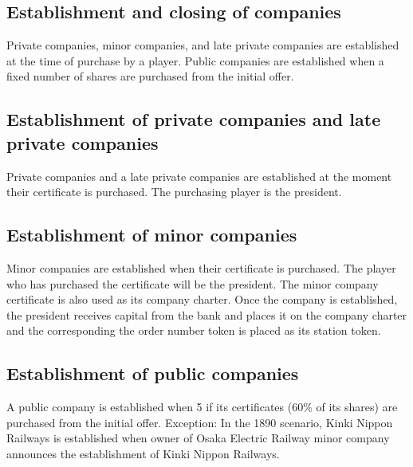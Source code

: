 \documentclass{article}
\begin{document}
\begin{CJK}{UTF8}{min}


\section{Establishment and closing of companies}
Private companies, minor companies, and late private companies are established at
the time of purchase by a player. Public companies are established
when a fixed number of shares are purchased from the initial offer.

\subsection{Establishment of private companies and late private companies}
Private companies and a late private companies are established at the
moment their certificate is purchased. The purchasing player is the
president.

\subsection{Establishment of minor companies}
Minor companies are established when their certificate is
purchased. The player who has purchased the certificate will be the
president. The minor company certificate is also used as its company
charter. Once the company is established, the
president receives capital from the bank and places it on the company
charter and the corresponding the order number token is placed as its
station token.

\subsection{Establishment of public companies}
A public company is established when 5 if its certificates (60\% of
its shares) are purchased from the initial offer. Exception: In the
1890 scenario, Kinki Nippon Railways is established when owner of
Osaka Electric Railway minor company announces the establishment of
Kinki Nippon Railways.


\end{CJK}
\end{document}
